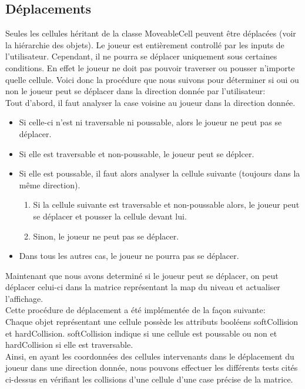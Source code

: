 \documentclass[../main.tex]{subfiles}
\begin{document}
\subsection{Déplacements}
Seules les cellules héritant de la classe MoveableCell peuvent être déplacées (voir la hiérarchie des objets).
Le joueur est entièrement controllé par les inputs de l'utilisateur.
Cependant, il ne pourra se déplacer uniquement sous certaines conditions.
En effet le joueur ne doit pas pouvoir traverser ou pousser n'importe quelle cellule.
Voici donc la procédure que nous suivons pour déterminer si oui ou non le joueur peut se déplacer dans la direction donnée par l'utilisateur:\\
Tout d'abord, il faut analyser la case voisine au joueur dans la direction donnée.
\begin{itemize}
	\item Si celle-ci n'est ni traversable ni poussable, alors le joueur ne peut pas se déplacer.
	\item Si elle est traversable et non-poussable, le joueur peut se déplcer.
	\item Si elle est poussable, il faut alors analyser la cellule suivante (toujours dans la même direction).
		\begin{enumerate}
			\item Si la cellule suivante est traversable et non-poussable alors, le joueur peut se déplacer et pousser la cellule devant lui.
			\item Sinon, le joueur ne peut pas se déplacer.
		\end{enumerate}
	\item Dans tous les autres cas, le joueur ne pourra pas se déplacer. 
\end{itemize}
Maintenant que nous avons determiné si le joueur peut se déplacer, on peut déplacer celui-ci dans la matrice représentant la map du niveau et actualiser l'affichage.\\

Cette procédure de déplacement a été implémentée de la façon suivante: \\
Chaque objet représentant une cellule possède les attributs booléens softCollision et hardCollision.
softCollision indique si une cellule est poussable ou non et hardCollision si elle est traversable.\\
Ainsi, en ayant les coordonnées des cellules intervenants dans le déplacement du joueur dans une direction donnée, nous pouvons effectuer les différents tests cités ci-dessus en vérifiant les collisions d'une cellule d'une case précise de la matrice.
\end{document}
